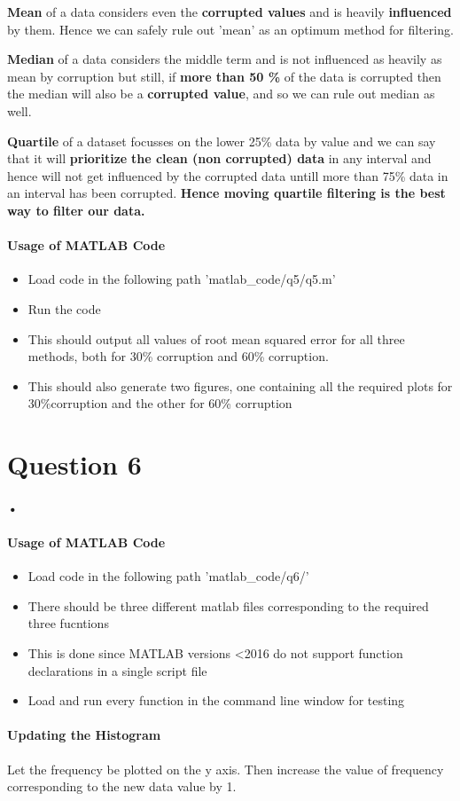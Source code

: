 \documentclass[12pt]{article}
\begin{document}
\textbf{Mean} of a data considers even the \textbf{corrupted values} and is heavily \textbf{influenced} by them. Hence we can safely rule out 'mean' as an optimum method for filtering.
 
 
\textbf{Median} of a data considers the middle term and is not influenced as heavily as mean by corruption but still, if \textbf{more than 50 \%} of the data is corrupted then the median will also be a \textbf{corrupted value}, and so we can rule out median as well.


\textbf{Quartile} of a dataset focusses on the lower 25\% data by value and we can say that it will \textbf{prioritize} \textbf{the clean (non corrupted) data} in any interval and hence will not get influenced by the corrupted data untill more than 75\% data in an interval has been corrupted.
\newline\newline
\textbf{Hence moving quartile filtering is the best way to filter our data.}

\newpage
\paragraph{Usage of MATLAB Code}
\begin{itemize}
\item Load code in the following path 'matlab\_code/q5/q5.m'
\item Run the code
\item This should output all values of root mean squared error for all three methods, both for 30\% corruption and 60\% corruption.
\item This should also generate two figures, one containing all the required plots for 30\%corruption and the other for 60\% corruption
\end{itemize}


\newpage
\section{Question 6}
\paragraph{•}

\paragraph{Usage of MATLAB Code}
\begin{itemize}
\item Load code in the following path 'matlab\_code/q6/'
\item There should be three different matlab files corresponding to the required three fucntions
\item This is done since MATLAB versions <2016 do not support function declarations in a single script file
\item Load and run every function in the command line window for testing
\end{itemize}
\paragraph{Updating the Histogram\newline}
Let the frequency be plotted on the y axis.\newline
Then increase the value of frequency corresponding to the new data value by 1.\newline
\end{document}
